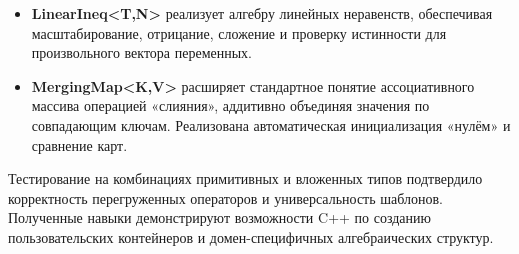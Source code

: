 \documentclass[a4paper, 14pt]{extarticle}
\begin{document}
\begin{itemize}[nosep]
  \item \textbf{LinearIneq<T,N>} реализует алгебру линейных неравенств,
        обеспечивая масштабирование, отрицание, сложение и проверку
        истинности для произвольного вектора переменных.
  \item \textbf{MergingMap<K,V>} расширяет стандартное понятие
        ассоциативного массива операцией «слияния», аддитивно объединяя
        значения по совпадающим ключам. Реализована автоматическая
        инициализация «нулём» и сравнение карт.
\end{itemize}

Тестирование на комбинациях примитивных и вложенных типов подтвердило
корректность перегруженных операторов и универсальность шаблонов.
Полученные навыки демонстрируют возможности C++ по созданию
пользовательских контейнеров и домен-специфичных алгебраических структур.
\end{document}
